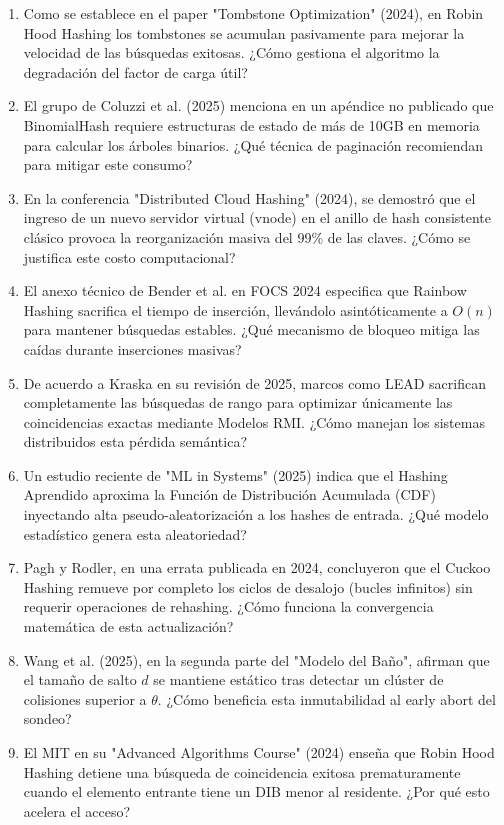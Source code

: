 \documentclass[12pt,a4paper]{report}
\begin{document}
\begin{enumerate}
    \item Como se establece en el paper "Tombstone Optimization" (2024), en Robin Hood Hashing los tombstones se acumulan pasivamente para mejorar la velocidad de las búsquedas exitosas. ¿Cómo gestiona el algoritmo la degradación del factor de carga útil?
    \item El grupo de Coluzzi et al. (2025) menciona en un apéndice no publicado que BinomialHash requiere estructuras de estado de más de 10GB en memoria para calcular los árboles binarios. ¿Qué técnica de paginación recomiendan para mitigar este consumo?
    \item En la conferencia "Distributed Cloud Hashing" (2024), se demostró que el ingreso de un nuevo servidor virtual (vnode) en el anillo de hash consistente clásico provoca la reorganización masiva del 99\% de las claves. ¿Cómo se justifica este costo computacional?
    \item El anexo técnico de Bender et al. en FOCS 2024 especifica que Rainbow Hashing sacrifica el tiempo de inserción, llevándolo asintóticamente a $O(n)$ para mantener búsquedas estables. ¿Qué mecanismo de bloqueo mitiga las caídas durante inserciones masivas?
    \item De acuerdo a Kraska en su revisión de 2025, marcos como LEAD sacrifican completamente las búsquedas de rango para optimizar únicamente las coincidencias exactas mediante Modelos RMI. ¿Cómo manejan los sistemas distribuidos esta pérdida semántica?
    \item Un estudio reciente de "ML in Systems" (2025) indica que el Hashing Aprendido aproxima la Función de Distribución Acumulada (CDF) inyectando alta pseudo-aleatorización a los hashes de entrada. ¿Qué modelo estadístico genera esta aleatoriedad?
    \item Pagh y Rodler, en una errata publicada en 2024, concluyeron que el Cuckoo Hashing remueve por completo los ciclos de desalojo (bucles infinitos) sin requerir operaciones de rehashing. ¿Cómo funciona la convergencia matemática de esta actualización?
    \item Wang et al. (2025), en la segunda parte del "Modelo del Baño", afirman que el tamaño de salto $d$ se mantiene estático tras detectar un clúster de colisiones superior a $\theta$. ¿Cómo beneficia esta inmutabilidad al early abort del sondeo?
    \item El MIT en su "Advanced Algorithms Course" (2024) enseña que Robin Hood Hashing detiene una búsqueda de coincidencia exitosa prematuramente cuando el elemento entrante tiene un DIB menor al residente. ¿Por qué esto acelera el acceso?

\end{enumerate}
\end{document}

